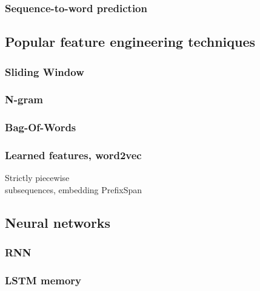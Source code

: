 \subsubsection{Sequence-to-word prediction}

\subsection{Popular feature engineering techniques}
\subsubsection{Sliding Window}
\subsubsection{N-gram}
\subsubsection{Bag-Of-Words}
\subsubsection{Learned features, word2vec}
Strictly piecewise\\
subsequences, embedding
PrefixSpan

\subsection{Neural networks}
\subsubsection{RNN}
\subsubsection{LSTM memory}